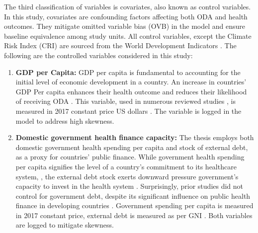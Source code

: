 The third classification of variables is covariates, also known as control variables. In this study, covariates are confounding factors affecting both ODA and health outcomes. They mitigate omitted variable bias (OVB) in the model and ensure baseline equivalence among study units. All control variables, except the Climate Risk Index (CRI) are sourced from the World Development Indicators \parencite{wdi_world_2023}. The following are the controlled variables considered in this study:

\begin{enumerate}[i]
    \item \textbf{GDP per Capita:} GDP per capita is fundamental to accounting for the initial level of economic development in a country. An increase in countries' GDP Per capita enhances their health outcome and reduces their likelihood of receiving ODA \parencite{oecd_ODA_Report_2023}. This variable, used in numerous reviewed studies \parencite[e.g.,][]{williamson_foreign_2008, nwude_impact_2023, toseef_how_2019}, is measured in 2017 constant price US dollars \textcite{wdi_world_2023}. The variable is logged in the model to address high skewness.
    \item \textbf{Domestic government health finance capacity:} The thesis employs both domestic government health spending per capita and stock of external debt, as a proxy for countries' public finance. While government health spending per capita signifies the level of a country's commitment to its healthcare system, \parencite[see][]{yan_mortality_2015, mohamed_foreign_2017, akinola_foreign_2022}, the external debt stock exerts downward pressure government's capacity to invest in the health system \parencite{kumar2010public, ogunjimi2019impact}. Surprisingly, prior studies did not control for government debt, despite its significant influence on public health finance in developing countries \parencite{kumar2010public}. Government spending per capita is measured in 2017 constant price, external debt is measured as per GNI \parencite{wdi_world_2023}. Both variables are logged to mitigate skewness.   
    

\end{enumerate}
